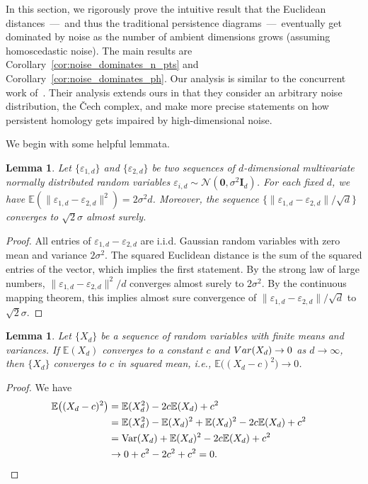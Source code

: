 \documentclass{article}
\theoremstyle{plain}
\newtheorem{lemma}[theorem]{Lemma}
\theoremstyle{definition}
\theoremstyle{remark}
\begin{document}
In this section, we rigorously prove the intuitive result that the Euclidean distances~---~and thus the traditional persistence diagrams~---~eventually get dominated by noise as the number of ambient dimensions grows (assuming homoscedastic noise). The main results are Corollary~\ref{cor:noise_dominates_n_pts} and Corollary~\ref{cor:noise_dominates_ph}. Our analysis is similar to the concurrent work of~\citet{hiraoka2024curse}. Their analysis extends ours in that they consider an arbitrary noise distribution, the \v{C}ech complex, and make more precise statements on how persistent homology gets impaired by high-dimensional noise.

We begin with some helpful lemmata.

\begin{lemma}\label{lem:multivariate_normal}
    Let $\{\varepsilon_{1, d}\}$ and $\{\varepsilon_{2, d}\}$ be two sequences of $d$-dimensional multivariate normally distributed random variables $\varepsilon_{i, d} \sim \mathcal{N}(\mathbf{0}, \sigma^2\mathbf{I}_d)$. For each fixed $d$, we have $\mathbb{E}(\| \varepsilon_{1, d}- \varepsilon_{2, d}\|^2) = 2 \sigma^2 d$. Moreover, the sequence $\{\|\varepsilon_{1, d} - \varepsilon_{2,d}\| /\sqrt{d}\}$ converges to $\sqrt{2}\sigma$ almost surely.
\end{lemma}
\begin{proof}
    All entries of $\varepsilon_{1, d}- \varepsilon_{2, d}$ are i.i.d. Gaussian random variables with zero mean and variance $2\sigma^2$. The squared Euclidean distance is the sum of the squared entries of the vector, which implies the first statement. By the strong law of large numbers, $\|\varepsilon_{1, d} - \varepsilon_{2,d}\|^2 / d$ converges almost surely to $2\sigma^2$. By the continuous mapping theorem, this implies almost sure convergence of $\|\varepsilon_{1, d} - \varepsilon_{2,d}\| /\sqrt{d}$ to $\sqrt{2}\sigma$.
\end{proof}

\begin{lemma}\label{lem:exp_var_sq_mean}
    Let $\{X_d\}$ be a sequence of random variables with finite means and variances. If $\mathbb{E}(X_d)$ converges to a constant $c$ and $\textnormal{Var}(X_d) \to 0$ as $d\to \infty$, then $\{X_d\}$ converges to $c$ in squared mean, i.e., $\mathbb{E}\big((X_d- c)^2\big) \to 0$.
\end{lemma}
\begin{proof}  
    We have 
    \begin{align}
        \mathbb{E}\big((X_d - c)^2\big) &= \mathbb{E}(X_d^2) - 2c\mathbb{E}(X_d) + c^2  \notag\\
        &= \mathbb{E}(X_d^2) - \mathbb{E}(X_d)^2 + \mathbb{E}(X_d)^2 - 2c\mathbb{E}(X_d) + c^2 \notag & \\
        &= \text{Var}(X_d) + \mathbb{E}(X_d)^2 - 2c\mathbb{E}(X_d) + c^2 \notag \\
        &\to 0 + c^2 - 2c^2 + c^2  = 0.
    \end{align}
\end{proof}
\end{document}
